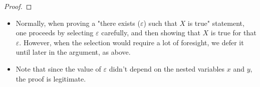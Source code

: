 \documentclass[../main.tex]{subfiles}
\begin{document}
\begin{itemize}
\begin{prp}
\begin{proof}
        \end{proof}
    \end{prp}
    \begin{itemize}
        \item Normally, when proving a "there exists ($\varepsilon$) such that $X$ is true" statement, one proceeds by selecting $\varepsilon$ carefully, and then showing that $X$ is true for that $\varepsilon$. However, when the selection would require a lot of foresight, we defer it until later in the argument, as above.
        \item Note that since the value of $\varepsilon$ didn't depend on the nested variables $x$ and $y$, the proof is legitimate.
    \end{itemize}
\end{itemize}
\end{document}
